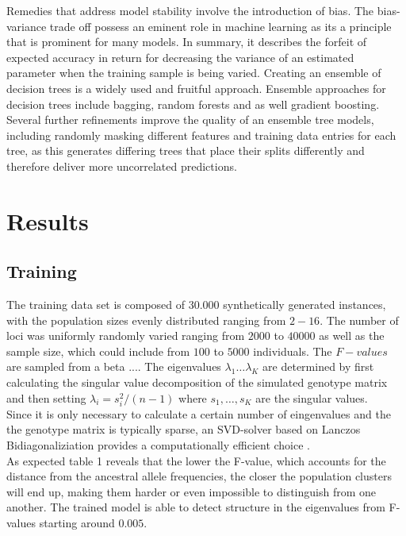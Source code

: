 \documentclass[a4paper, 11pt]{article}
\begin{document}
Remedies that address model stability involve the introduction of bias. The bias-variance trade off possess an eminent role in machine learning as its a principle that is prominent for many models. In summary, it describes the forfeit of expected accuracy in return for decreasing the variance of an estimated parameter when the training sample is being varied. Creating an ensemble of decision trees is a widely used and fruitful approach. Ensemble approaches for decision trees include bagging, random forests and as well gradient boosting. Several further refinements improve the quality of an ensemble tree models, including randomly masking different features and training data entries for each tree, as this generates differing trees that place their splits differently and therefore deliver more uncorrelated predictions.

\section{Results}

\subsection{Training}
The training data set is composed of $30.000$ synthetically generated instances, with the population sizes evenly distributed ranging from $2-16$.
The number of loci was uniformly randomly varied ranging from $2000$ to $40000$ as well as the sample size, which could include from $100$ to $5000$ individuals. The $F-values$ are sampled from a beta ....
The eigenvalues $\lambda_1 \ldots \lambda_K$ are determined by first calculating the singular value decomposition of the simulated genotype matrix and then setting $\lambda_i = s_i^2 / (n-1)$ where $s_1, \ldots, s_K$ are the singular values.\\
Since it is only necessary to calculate a certain number of eingenvalues and the the genotype matrix is typically sparse, an SVD-solver based on Lanczos Bidiagonaliziation provides a computationally efficient choice \parencite{golub1965calculating}.\\
As expected table 1 reveals that the lower the F-value, which accounts for the distance from the ancestral allele frequencies, the closer the population clusters will end up, making them harder or even impossible to distinguish from one another. The trained model is able to detect structure in the eigenvalues from F-values starting around $0.005$. 
\end{document}
